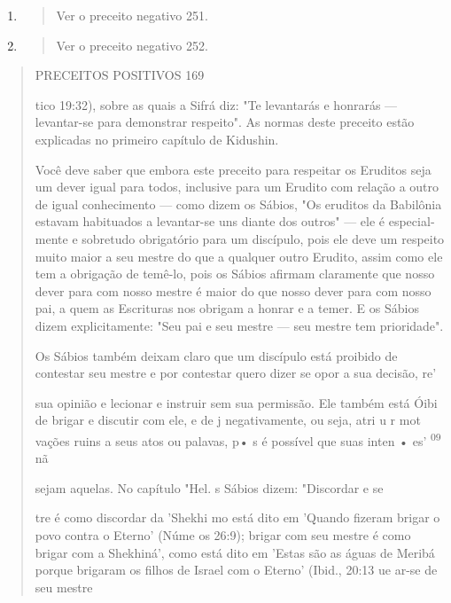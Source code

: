 \begin{enumerate}
\def\labelenumi{\arabic{enumi}.}
\setcounter{enumi}{206}
\item
  \begin{quote}
  Ver o preceito negativo 251.
  \end{quote}
\item
  \begin{quote}
  Ver o preceito negativo 252.
  \end{quote}
\end{enumerate}

\begin{quote}
PRECEITOS POSITIVOS 169

tico 19:32), sobre as quais a Sifrá diz: "Te levantarás e honrarás ---
levantar-se para demonstrar respeito". As normas deste preceito estão
explicadas no pri­meiro capítulo de Kidushin.

Você deve saber que embora este preceito para respeitar os Erudi­tos
seja um dever igual para todos, inclusive para um Erudito com relação a
outro de igual conhecimento --- como dizem os Sábios, "Os eruditos da
Babi­lônia estavam habituados a levantar-se uns diante dos outros" ---
ele é especial­mente e sobretudo obrigatório para um discípulo, pois ele
deve um respeito muito maior a seu mestre do que a qualquer outro
Erudito, assim como ele tem a obrigação de temê-lo, pois os Sábios
afirmam claramente que nosso dever pa­ra com nosso mestre é maior do que
nosso dever para com nosso pai, a quem as Escrituras nos obrigam a
honrar e a temer. E os Sábios dizem explicitamente: "Seu pai e seu
mestre --- seu mestre tem prioridade".

Os Sábios também deixam claro que um discípulo está proibido de
contestar seu mestre e por contestar quero dizer se opor a sua decisão,
re'

sua opinião e lecionar e instruir sem sua permissão. Ele também está
Óibi de brigar e discutir com ele, e de j negativamente, ou seja, atri u
r mot\\
vações ruins a seus atos ou palavas, p• s é possível que suas inten •
es' \textsuperscript{09} nã

sejam aquelas. No capítulo "Hel. s Sábios dizem: "Discordar e se

tre é como discordar da 'Shekhi mo está dito em 'Quando fizeram brigar o
povo contra o Eterno' (Núme os 26:9); brigar com seu mestre é como
brigar com a Shekhiná', como está dito em 'Estas são as águas de Meribá
porque bri­garam os filhos de Israel com o Eterno' (Ibid., 20:13 ue
ar-se de seu mestre


\end{quote}
